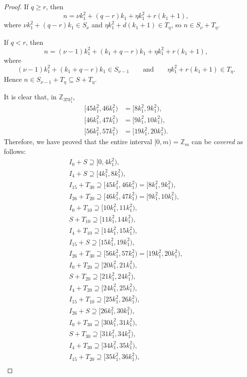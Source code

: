 \documentclass[11pt]{article}
\theoremstyle{definition}
\def\Z{\mbox{$\mathbb Z$}}
\begin{document}
\begin{proof}
If $q \geq r$, then
\[
n = \nu k_1^2 + (q - r) k_1+\eta k_1^2 + r(k_1 + 1), 
\]
where $\nu k_1^2 + (q - r)k_1 \in S_\nu$ and $\eta k_1^2 + d(k_1 + 1) \in T_\eta$, so $n \in S_\nu +T_\eta$. 

If $q <r$, then
\[
n = (\nu  - 1)k_1^2 + (k_1 + q - r) k_1+\eta k_1^2 + r(k_1 + 1), 
\]
where 
\[
(\nu  - 1)k_1^2 + (k_1 + q - r)k_1 \in S_{\nu  - 1}\qquad\text{and}\qquad
\eta k_1^2 + r(k_1 + 1) \in T_\eta.
\]
Hence $n \in S_{\nu-1}+T_\eta\subseteq S+T_{\eta}$. 


It is clear that, in $\Z_{37k_{1}^{2}}$,
\begin{align*}
[45k_{1}^{2},46k_{1}^{2})&=[8k_1^2, 9k_1^2),\\
[46k_{1}^{2},47k_{1}^{2})&=[9k_1^2, 10k_1^2),\\
[56k_{1}^{2},57k_{1}^{2})&=[19k_1^2, 20k_1^2).
\end{align*}
Therefore, we have proved that the entire interval $[0, m)=\Z_{m}$ can be  {\em covered\/} as follows: 
\begin{align*}
I_0 + S  \supseteq [0, 4k_1^2),\\
I_4 + S  \supseteq [4k_1^2, 8k_1^2),\\
I_{15} + T_{30}  \supseteq[45k_{1}^{2},46k_{1}^{2})= [8k_1^2, 9k_1^2),\\
I_{26} + T_{20}  \supseteq[46k_{1}^{2},47k_{1}^{2})= [9k_1^2, 10k_1^2),\\
I_{0}+T_{10}  \supseteq [10k_1^2, 11k_1^2),\\
S+T_{10}  \supseteq [11k_1^2, 14k_1^2),\\
I_{4} + T_{10}  \supseteq [14k_1^2, 15k_1^2),\\
I_{15} + S  \supseteq [15k_1^2, 19k_1^2),\\
I_{26} + T_{30}  \supseteq[56k_{1}^{2},57k_{1}^{2})= [19k_1^2, 20k_1^2),\\
I_{0} + T_{20}  \supseteq [20k_1^2, 21k_1^2),\\
S + T_{20}  \supseteq [21k_1^2, 24k_1^2),\\
I_{4} + T_{20}  \supseteq [24k_1^2, 25k_1^2),\\
I_{15} + T_{10}  \supseteq [25k_1^2, 26k_1^2),\\
I_{26} + S  \supseteq [26k_1^2, 30k_1^2),\\
I_{0} + T_{30}  \supseteq [30k_1^2, 31k_1^2),\\
S + T_{30}  \supseteq [31k_1^2, 34k_1^2),\\
I_{4} + T_{30}  \supseteq [34k_1^2, 35k_1^2),\\
I_{15} + T_{20}  \supseteq [35k_1^2, 36k_1^2),\\

\end{align*}
\end{proof}
\end{document}
